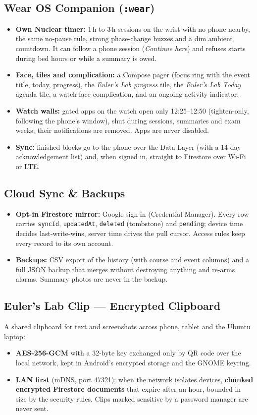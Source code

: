 \documentclass[11pt,a4paper]{article}
\begin{document}
\subsection{Wear OS Companion (\texttt{:wear})}
\begin{itemize}
  \item \textbf{Own Nuclear timer:} 1\,h to 3\,h sessions on the wrist with no phone nearby, the same no-pause rule, strong phase-change buzzes and a dim ambient countdown. It can follow a phone session (\emph{Continue here}) and refuses starts during bed hours or while a summary is owed.
  \item \textbf{Face, tiles and complication:} a Compose pager (focus ring with the event title, today, progress), the \emph{Euler's Lab progress} tile, the \emph{Euler's Lab Today} agenda tile, a watch-face complication, and an ongoing-activity indicator.
  \item \textbf{Watch walls:} gated apps on the watch open only 12:25--12:50 (tighten-only, following the phone's window), shut during sessions, summaries and exam weeks; their notifications are removed. Apps are never disabled.
  \item \textbf{Sync:} finished blocks go to the phone over the Data Layer (with a 14-day acknowledgement list) and, when signed in, straight to Firestore over Wi-Fi or LTE.
\end{itemize}

\subsection{Cloud Sync \& Backups}
\begin{itemize}
  \item \textbf{Opt-in Firestore mirror:} Google sign-in (Credential Manager). Every row carries \texttt{syncId}, \texttt{updatedAt}, \texttt{deleted} (tombstone) and \texttt{pending}; device time decides last-write-wins, server time drives the pull cursor. Access rules keep every record to its own account.
  \item \textbf{Backups:} CSV export of the history (with course and event columns) and a full JSON backup that merges without destroying anything and re-arms alarms. Summary photos are never in the backup.
\end{itemize}

\subsection{Euler's Lab Clip --- Encrypted Clipboard}
A shared clipboard for text and screenshots across phone, tablet and the Ubuntu laptop:
\begin{itemize}
  \item \textbf{AES-256-GCM} with a 32-byte key exchanged only by QR code over the local network, kept in Android's encrypted storage and the GNOME keyring.
  \item \textbf{LAN first} (mDNS, port 47321); when the network isolates devices, \textbf{chunked encrypted Firestore documents} that expire after an hour, bounded in size by the security rules. Clips marked sensitive by a password manager are never sent.
\end{itemize}
\end{document}
